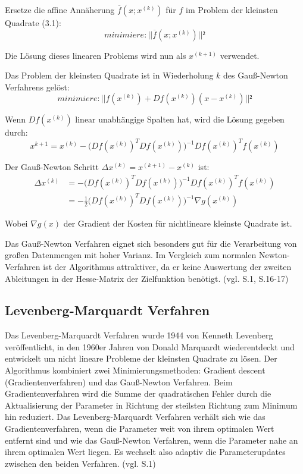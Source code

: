 Ersetze die affine Annäherung $ \overline{f}(x;x^{(k)})$ für $f$ im Problem der kleinsten Quadrate (3.1):
\begin{equation}
minimiere: ||\overline{f}(x;x^{(k)})||²
\end{equation}

Die Lösung dieses linearen Problems wird nun als $x^{(k+1)}$ verwendet. 

Das Problem der kleinsten Quadrate ist in Wiederholung $k$ des Gauß-Newton Verfahrens gelöst:
\begin{equation}
minimiere: ||f(x^{(k)}) + Df(x^{(k)})(x-x^{(k)})||²
\end{equation}

Wenn $Df(x^{(k)}) $ linear unabhängige Spalten hat, wird die Lösung gegeben durch:
\begin{equation}
x^{k+1} = x^{(k)}-\Big(Df(x^{(k)})^TDf(x^{(k)})\Big)^{-1} Df(x^{(k)})^T f(x^{(k)})
\end{equation}

Der Gauß-Newton Schritt $\Delta x^{(k)} = x^{(k+1)} - x^{(k)}$ ist:
\begin{equation}
\begin{aligned}
\Delta x^{(k)} &= -\Big(Df(x^{(k)})^TDf(x^{(k)})\Big)^{-1} Df(x^{(k)})^T f(x^{(k)})\\ &= -\frac{1}{2} \Big(Df(x^{(k)})^TDf(x^{(k)})\Big)^{-1} \nabla g(x^{(k)})
\end{aligned}
\end{equation}

Wobei $\nabla g(x)$ der Gradient der Kosten für nichtlineare kleinste Quadrate ist.

Das Gauß-Newton Verfahren eignet sich besonders gut für die Verarbeitung von großen Datenmengen mit hoher Varianz. Im Vergleich zum normalen Newton-Verfahren ist der Algorithmus attraktiver, da er keine Auswertung der zweiten Ableitungen in der Hesse-Matrix der Zielfunktion benötigt. (vgl.\cite{approx_gn} S.1, \cite{nonlinear_1} S.16-17)


\subsection{Levenberg-Marquardt Verfahren}

Das Levenberg-Marquardt Verfahren wurde 1944 von Kenneth Levenberg \cite{levenberg} veröffentlicht, in den 1960er Jahren von Donald Marquardt wiederentdeckt und entwickelt um nicht lineare Probleme der kleinsten Quadrate zu lösen. Der Algorithmus kombiniert zwei Minimierungsmethoden: \glqq Gradient descent\grqq{} (Gradientenverfahren) und das Gauß-Newton Verfahren. Beim Gradientenverfahren wird die Summe der quadratischen Fehler durch die Aktualisierung der Parameter in Richtung der steilsten Richtung zum Minimum hin reduziert. Das Levenberg-Marquardt Verfahren verhält sich wie das Gradientenverfahren, wenn die Parameter weit von ihrem optimalen Wert entfernt sind und wie das Gauß-Newton Verfahren, wenn die Parameter nahe an ihrem optimalen Wert liegen. Es wechselt also adaptiv die Parameterupdates zwischen den beiden Verfahren. (vgl. \cite{lev_mar} S.1)

